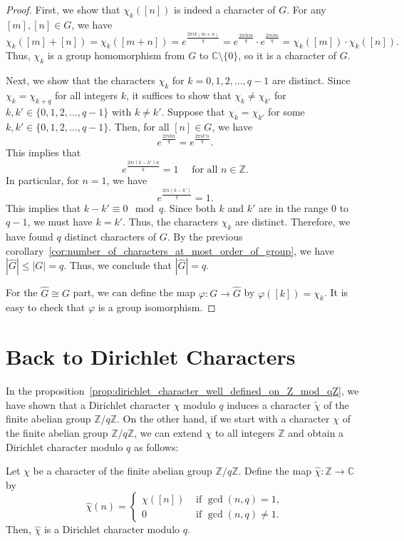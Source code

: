 \documentclass{elegantbook}
\begin{document}
\begin{proof}
  First, we show that $\chi_k([n])$ is indeed a character of $G$. For any $[m],[n]\in G$, we have
  \[
    \chi_k([m] + [n]) = \chi_k([m+n]) = e^{\frac{2\pi i k (m+n)}{q}} = e^{\frac{2\pi i k m}{q}} \cdot e^{\frac{2\pi i k n}{q}} = \chi_k([m]) \cdot \chi_k([n]).
  \]
  Thus, $\chi_k$ is a group homomorphism from $G$ to $\mathbb{C}\setminus\{0\}$, so it is a character of $G$.

  Next, we show that the characters $\chi_k$ for $k = 0, 1, 2, \ldots, q-1$ are distinct. Since $\chi_{k}=\chi_{k+q}$ for all integers $k$, it suffices to show that $\chi_k \ne \chi_{k'}$ for $k,k' \in \{0, 1, 2, \ldots, q-1\}$ with $k \ne k'$.
  Suppose that $\chi_k = \chi_{k'}$ for some $k,k' \in \{0, 1, 2, \ldots, q-1\}$. Then, for all $[n] \in G$, we have
  \[
    e^{\frac{2\pi i k n}{q}} = e^{\frac{2\pi i k' n}{q}}.
  \]
  This implies that
  \[
    e^{\frac{2\pi i (k - k') n}{q}} = 1 \quad \text{ for all } n \in \mathbb{Z}.
  \]
  In particular, for $n = 1$, we have
  \[
    e^{\frac{2\pi i (k - k')}{q}} = 1.
  \]
  This implies that $k - k' \equiv 0 \mod q$. Since both $k$ and $k'$ are in the range $0$ to $q-1$, we must have $k = k'$. Thus, the characters $\chi_k$ are distinct. 
  Therefore, we have found $q$ distinct characters of $G$. By the previous corollary~\ref{cor:number_of_characters_at_most_order_of_group}, we have $|\widehat{G}| \leq |G| = q$. Thus, we conclude that $|\widehat{G}| = q$.

  For the $\widehat{G} \cong G$ part, we can define the map $\varphi:G\to \widehat{G}$ by $\varphi([k]) = \chi_k$. It is easy to check that $\varphi$ is a group isomorphism.
\end{proof}

\section{Back to Dirichlet Characters}

In the proposition~\ref{prop:dirichlet_character_well_defined_on_Z_mod_qZ}, we have shown that a Dirichlet character $\chi$ modulo $q$ induces a character $\widetilde{\chi}$ of the finite abelian group $\mathbb{Z}/q\mathbb{Z}$. On the other hand, if we start with a character $\chi$ of the finite abelian group $\mathbb{Z}/q\mathbb{Z}$, we can extend $\chi$ to all integers $\mathbb{Z}$ and obtain a Dirichlet character modulo $q$ as follows:

\begin{proposition} \label{prop:character_of_Z_mod_qZ_to_dirichlet_character}
  Let $\chi$ be a character of the finite abelian group $\mathbb{Z}/q\mathbb{Z}$. Define the map $\widehat{\chi}:\mathbb{Z}\to \mathbb{C}$ by
  \[
    \widehat{\chi}(n) = \begin{cases}
      \chi([n]) & \text{ if } \gcd(n,q) = 1, \\
      0 & \text{ if } \gcd(n,q) \ne 1.
    \end{cases}
  \]
  Then, $\widehat{\chi}$ is a Dirichlet character modulo $q$.
\end{proposition}
\end{document}
